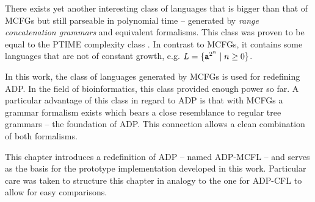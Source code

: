 \documentclass[
    a4paper,
    12pt,
    twoside,
    BCOR=12mm,
    parskip=half,
    chapterprefix,
    numbers=noenddot,
    bibliography=totoc
]{scrbook}
\begin{document}
\pagebreak

There exists yet another interesting class of languages that is bigger than that of \glspl{MCFG} but still parseable in polynomial time -- generated by \emph{range concatenation grammars} and equivalent formalisms. This class was proven to be equal to the PTIME complexity class \citep{bertsch_complexity_2001}. In contrast to \glspl{MCFG}, it contains some languages that are not of constant growth, e.g. $L = \{\ts{a}^{2^n} \mid n \geq 0 \}$.

In this work, the class of languages generated by \glspl{MCFG} is used for redefining \gls{ADP}. In the field of bioinformatics, this class provided enough power so far. A particular advantage of this class in regard to \gls{ADP} is that with \glspl{MCFG} a grammar formalism exists which bears a close resemblance to regular tree grammars -- the foundation of \gls{ADP}. This connection allows a clean combination of both formalisms.

This chapter introduces a redefinition of ADP -- named \gls{ADP-MCFL} -- and serves as the basis for the prototype implementation developed in this work. Particular care was taken to structure this chapter in analogy to the one for \gls{ADP-CFL} to allow for easy comparisons.
\end{document}
